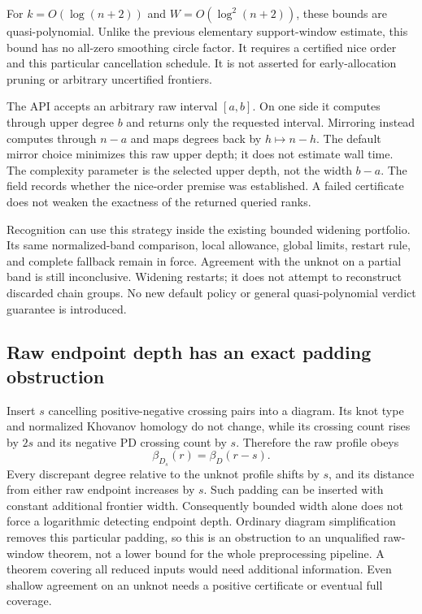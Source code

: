 For $k=O(\log(n+2))$ and $W=O(\log^2(n+2))$, these bounds are
quasi-polynomial. Unlike the previous elementary support-window estimate,
this bound has no all-zero smoothing circle factor. It requires a
certified nice order and this particular cancellation schedule. It is
not asserted for early-allocation pruning or arbitrary uncertified
frontiers.

The API  accepts an arbitrary raw
interval $[a,b]$. On one side it computes through upper degree $b$ and
returns only the requested interval. Mirroring instead computes through
$n-a$ and maps degrees back by $h\mapsto n-h$. The default mirror choice
minimizes this raw upper depth; it does not estimate wall time.
The complexity parameter is the selected upper depth, not the width
$b-a$. The  field records whether the
nice-order premise was established. A failed certificate does not weaken
the exactness of the returned queried ranks.

Recognition can use this strategy inside the existing bounded widening
portfolio. Its same normalized-band comparison, local allowance, global
limits, restart rule, and complete fallback remain in force. Agreement
with the unknot on a partial band is still inconclusive. Widening restarts;
it does not attempt to reconstruct discarded chain groups. No new default
policy or general quasi-polynomial verdict guarantee is introduced.

\subsection{Raw endpoint depth has an exact padding obstruction}
Insert $s$ cancelling positive-negative crossing pairs into a diagram.
Its knot type and normalized Khovanov homology do not change, while its
crossing count rises by $2s$ and its negative PD crossing count by $s$.
Therefore the raw profile obeys
\[
 \beta_{D_s}(r)=\beta_D(r-s).
\]
Every discrepant degree relative to the unknot profile shifts by $s$,
and its distance from either raw endpoint increases by $s$. Such padding
can be inserted with constant additional frontier width. Consequently
bounded width alone does not force a logarithmic detecting endpoint depth.
Ordinary diagram simplification removes this particular padding, so this
is an obstruction to an unqualified raw-window theorem, not a lower bound
for the whole preprocessing pipeline. A theorem covering all reduced
inputs would need additional information. Even shallow agreement on an
unknot needs a positive certificate or eventual full coverage.

